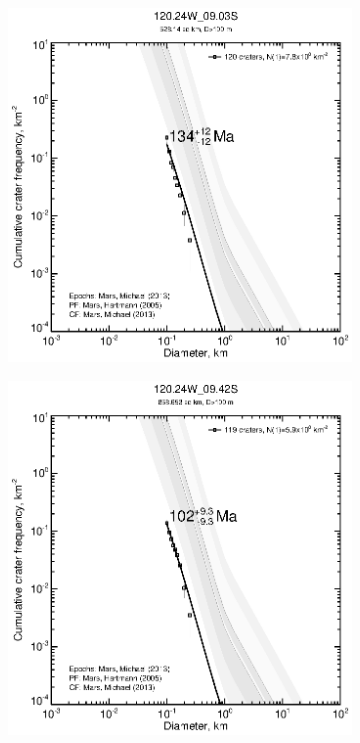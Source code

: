 \documentclass[12pt,letter]{article}
\begin{document}
\begin{figure}[h]
\centering
\begin{subfigure}{.33\textwidth}
  \includegraphics[width=\linewidth,clip,trim=1cm 1cm 1.5cm 1cm]{figures/craterstats/120-24W_09-03S_100m_cum.eps}
\end{subfigure}%
\begin{subfigure}{.33\textwidth}
  \includegraphics[width=\linewidth,clip,trim=1cm 1cm 1.5cm 1cm]{figures/craterstats/120-24W_09-42S_100m_cum.eps}

\end{subfigure}
\end{figure}
\end{document}
